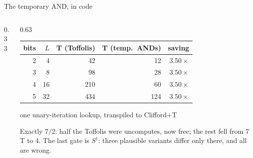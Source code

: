 \documentclass[aspectratio=169,11pt]{beamer}
\newcommand{\code}[2][]{}
\begin{document}
\setcounter{framenumber}{51}
\begin{frame}[fragile]{The temporary AND, in code}
  \begin{columns}[T]
    \begin{column}{0.33\textwidth}
      \code[basicstyle=\ttfamily\scriptsize]{and_compute.py}
    \end{column}
    \begin{column}{0.63\textwidth}
      \centering\footnotesize
      \renewcommand{\arraystretch}{1.1}
      \begin{tabular}{@{}rrrrr@{}}
        \toprule
        bits & $L$ & T (Toffolis) & T (temp.\ ANDs) & saving \\
        \midrule
        2 & 4 & 42 & 12 & $3.50\times$ \\
        3 & 8 & 98 & 28 & $3.50\times$ \\
        4 & 16 & 210 & 60 & $3.50\times$ \\
        5 & 32 & 434 & 124 & $3.50\times$ \\
        \bottomrule
      \end{tabular}\par
      {\scriptsize one unary-iteration lookup, transpiled to Clifford$+$T}\par
      \vskip1.5mm
      \raggedright\small
      Exactly $7/2$: half the Toffolis were uncomputes, now free; the rest fell from 7 T to 4. The last gate is $S^\dagger$: three plausible variants differ only there, and all are wrong.
    \end{column}
  \end{columns}
  \code[basicstyle=\ttfamily\scriptsize]{and_uncompute.py}
\end{frame}
\end{document}
